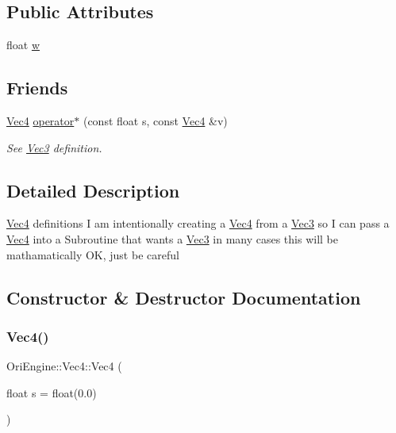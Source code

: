 \subsection*{Public Attributes}
\begin{DoxyCompactItemize}
\item 
float \hyperlink{struct_ori_engine_1_1_vec4_ab69be65aad84be7c1904aef48cb34f95}{w}
\end{DoxyCompactItemize}
\subsection*{Friends}
\begin{DoxyCompactItemize}
\item 
\hyperlink{struct_ori_engine_1_1_vec4}{Vec4} \hyperlink{struct_ori_engine_1_1_vec4_a23071d3ed3480029acaf809bdaf37c24}{operator$\ast$} (const float s, const \hyperlink{struct_ori_engine_1_1_vec4}{Vec4} \&v)
\begin{DoxyCompactList}\small\item\em See \hyperlink{struct_ori_engine_1_1_vec3}{Vec3} definition. \end{DoxyCompactList}\end{DoxyCompactItemize}


\subsection{Detailed Description}
\hyperlink{struct_ori_engine_1_1_vec4}{Vec4} definitions I am intentionally creating a \hyperlink{struct_ori_engine_1_1_vec4}{Vec4} from a \hyperlink{struct_ori_engine_1_1_vec3}{Vec3} so I can pass a \hyperlink{struct_ori_engine_1_1_vec4}{Vec4} into a Subroutine that wants a \hyperlink{struct_ori_engine_1_1_vec3}{Vec3} in many cases this will be mathamatically OK, just be careful 

\subsection{Constructor \& Destructor Documentation}
\hypertarget{struct_ori_engine_1_1_vec4_a28be40c1d1f863b5d62ca6283c49e388}{}\label{struct_ori_engine_1_1_vec4_a28be40c1d1f863b5d62ca6283c49e388} 
\subsubsection{\texorpdfstring{Vec4()}{Vec4()}\hspace{0.1cm}{\footnotesize\ttfamily [1/4]}}
{\footnotesize\ttfamily Ori\+Engine\+::\+Vec4\+::\+Vec4 (\begin{DoxyParamCaption}\item[{float}]{s = {\ttfamily float(0.0)} }\end{DoxyParamCaption})\hspace{0.3cm}{\ttfamily [inline]}}



